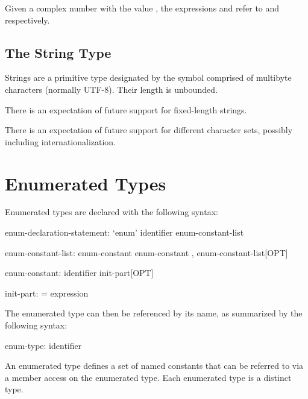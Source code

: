 \begin{example}
Given a complex number  with the value , the
expressions  and  refer to 
and  respectively.
\end{example}

\subsection{The String Type}
\label{The_String_Type}

Strings are a primitive type designated by the symbol 
comprised of multibyte characters (normally UTF-8).  Their length is unbounded.


\begin{openissue}
There is an expectation of future support for fixed-length strings.
\end{openissue}

\begin{openissue}
There is an expectation of future support for different character
sets, possibly including internationalization.
\end{openissue}


\section{Enumerated Types}
\label{Enumerated_Types}

Enumerated types are declared with the following syntax:

\begin{syntax}
enum-declaration-statement:
  `enum' identifier { enum-constant-list }

enum-constant-list:
  enum-constant
  enum-constant , enum-constant-list[OPT]

enum-constant:
  identifier init-part[OPT]

init-part:
  = expression
\end{syntax}

The enumerated type can then be referenced by its name, as summarized
by the following syntax:

\begin{syntax}
enum-type:
  identifier
\end{syntax}

An enumerated type defines a set of named constants that can be
referred to via a member access on the enumerated type.
Each enumerated type is a distinct type.

